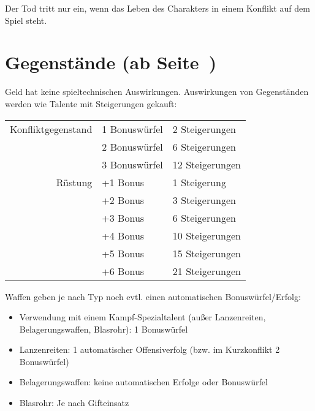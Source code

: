 Der Tod tritt nur ein, wenn das Leben des Charakters in einem Konflikt auf dem Spiel steht.


\section[Gegenstände]{Gegenstände (ab Seite~\pageref{Ch:Gegenstaende})}
Geld hat keine spieltechnischen Auswirkungen. Auswirkungen von Gegenständen werden wie Talente mit Steigerungen gekauft:

\begin{tabular}[C]{rll}
  Konfliktgegenstand & 1 Bonuswürfel & 2 Steigerungen \\
                     & 2 Bonuswürfel & 6 Steigerungen \\
                     & 3 Bonuswürfel & 12 Steigerungen \\[\medskipamount]
  Rüstung            & +1 Bonus & 1 Steigerung \\
                     & +2 Bonus & 3 Steigerungen \\
                     & +3 Bonus & 6 Steigerungen \\
                     & +4 Bonus & 10 Steigerungen \\
                     & +5 Bonus & 15 Steigerungen \\
                     & +6 Bonus & 21 Steigerungen \\
\end{tabular}

Waffen geben je nach Typ noch evtl. einen automatischen Bonuswürfel/Erfolg:
\begin{itemize}
\item Verwendung mit einem Kampf-Spezialtalent (außer Lanzenreiten, Belagerungswaffen, Blasrohr): 1 Bonuswürfel
\item Lanzenreiten: 1 automatischer Offensiverfolg (bzw. im Kurzkonflikt 2 Bonuswürfel)
\item Belagerungswaffen: keine automatischen Erfolge oder Bonuswürfel
\item Blasrohr: Je nach Gifteinsatz
\end{itemize}


